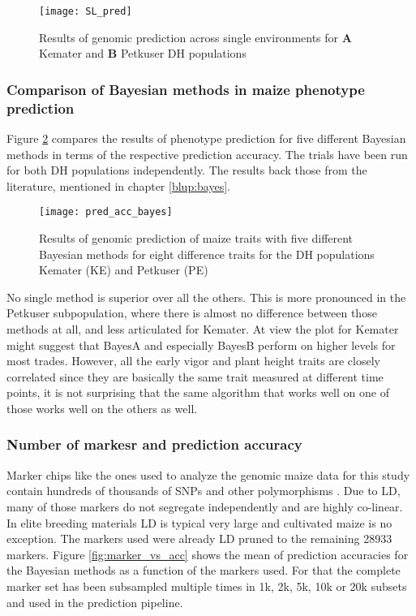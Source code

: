 \begin{figure}[H]
 \centering \texttt{[image: SL\_pred]}
 \decoRule
 \caption[Results of genomic prediction across single environments for Kemater and
 Petkuser DH populations]{Results of genomic prediction across single environments for
   \textbf{A} Kemater and \textbf{B} Petkuser DH populations}
\label{fig:sl_pred}
\end{figure}

\subsubsection{Comparison of Bayesian methods in maize phenotype prediction}

Figure \ref{fig:bayes_vs_acc} compares the results of phenotype prediction for five
different Bayesian methods in terms of the respective prediction accuracy. The trials have
been run for both DH populations independently. The results back those from the
literature, mentioned in chapter \ref{blup:bayes}.

\begin{figure}[H]
 \centering \texttt{[image: pred\_acc\_bayes]}
 \decoRule
 \caption[Results of genomic prediction of maize traits with five different Bayesian
 methods]{Results of genomic prediction of maize traits with five different Bayesian
   methods for eight difference traits for the DH populations Kemater (KE) and Petkuser
   (PE)}
\label{fig:bayes_vs_acc}
\end{figure}

No single method is superior over all the others. This is more pronounced in the Petkuser
subpopulation, where there is almost no difference between those methods at all, and less
articulated for Kemater. At view the plot for Kemater might suggest that BayesA and
especially BayesB perform on higher levels for most trades. However, all the early vigor
and plant height traits are closely correlated since they are basically the same trait
measured at different time points, it is not surprising that the same algorithm that works
well on one of those works well on the others as well.

\subsubsection{Number of markesr and prediction accuracy}

Marker chips like the ones used to analyze the genomic maize data for this study contain
hundreds of thousands of SNPs and other polymorphisms \cite{unterseer2014powerful}. Due to
LD, many of those markers do not segregate independently and are highly co-linear. In
elite breeding materials LD is typical very large and cultivated maize is no
exception. The markers used were already LD pruned to the remaining 28933 markers. Figure
\ref{fig:marker_vs_acc} shows the mean of prediction accuracies for the Bayesian methods
as a function of the markers used. For that the complete marker set has been subsampled
multiple times in 1k, 2k, 5k, 10k or 20k subsets and used in the prediction pipeline.

